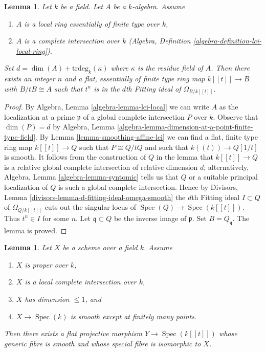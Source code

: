 \documentclass{stacks-project}
\theoremstyle{plain}
\newtheorem{lemma}[subsection]{Lemma}
\theoremstyle{definition}
\theoremstyle{remark}
\numberwithin{equation}{subsection}
\def\Spec{\mathop{\mathrm{Spec}}}
\begin{document}
\begin{lemma}
\label{lemma-smoothing-at-lci-point}
Let $k$ be a field. Let $A$ be a $k$-algebra. Assume
\begin{enumerate}
\item $A$ is a local ring essentially of finite type over $k$,
\item $A$ is a complete intersection over $k$
(Algebra, Definition \ref{algebra-definition-lci-local-ring}).
\end{enumerate}
Set $d = \dim(A) + \text{trdeg}_k(\kappa)$ where $\kappa$
is the residue field of $A$. Then there exists an integer $n$
and a flat, essentially of finite type ring map
$k[[t]] \to B$ with $B/tB \cong A$ such that $t^n$ is in the
$d$th Fitting ideal of $\Omega_{B/k[[t]]}$.
\end{lemma}

\begin{proof}
By Algebra, Lemma \ref{algebra-lemma-lci-local} we can write $A$ as the
localization at a prime $\mathfrak p$ of a global complete intersection $P$
over $k$. Observe that $\dim(P) = d$ by
Algebra, Lemma \ref{algebra-lemma-dimension-at-a-point-finite-type-field}.
By Lemma \ref{lemma-smoothing-affine-lci} we can find a
flat, finite type ring map $k[[t]] \to Q$ such that $P \cong Q/tQ$ and
such that $k((t)) \to Q[1/t]$ is smooth. It follows from the construction
of $Q$ in the lemma that $k[[t]] \to Q$ is a relative global
complete intersection of relative dimension $d$; alternatively,
Algebra, Lemma \ref{algebra-lemma-syntomic} tells us that $Q$ or a
suitable principal localization of $Q$ is such a global complete intersection.
Hence by Divisors, Lemma \ref{divisors-lemma-d-fitting-ideal-omega-smooth}
the $d$th Fitting ideal $I \subset Q$ of $\Omega_{Q/k[[t]]}$
cuts out the singular locus of $\Spec(Q) \to \Spec(k[[t]])$.
Thus $t^n \in I$ for some $n$.
Let $\mathfrak q \subset Q$
be the inverse image of $\mathfrak p$. Set $B = Q_\mathfrak q$.
The lemma is proved.
\end{proof}

\begin{lemma}
\label{lemma-smoothing-proper-curve-isolated-lci}
Let $X$ be a scheme over a field $k$. Assume
\begin{enumerate}
\item $X$ is proper over $k$,
\item $X$ is a local complete intersection over $k$,
\item $X$ has dimension $\leq 1$, and
\item $X \to \Spec(k)$ is smooth except at finitely many points.
\end{enumerate}
Then there exists a flat projective morphism $Y \to \Spec(k[[t]])$
whose generic fibre is smooth and whose special fibre is
isomorphic to $X$.
\end{lemma}
\end{document}
